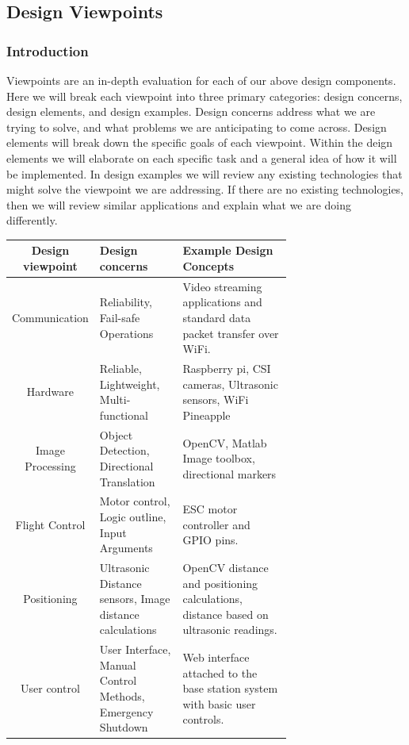 \documentclass[onecolumn, draftclsnofoot,10pt, compsoc]{IEEEtran}
\begin{document}
\subsection{Design Viewpoints} %

\subsubsection{Introduction}  
	Viewpoints are an in-depth evaluation for each of our above design components. Here we will break each viewpoint into three primary categories: design concerns, design elements, and design examples. Design concerns address what we are trying to solve, and what problems we are anticipating to come across. Design elements will break down the specific goals of each viewpoint. Within the deign elements we will elaborate on each specific task and a general idea of how it will be implemented. In design examples we will review any existing technologies that might solve the viewpoint we are addressing. If there are no existing technologies, then we will review similar applications and explain what we are doing differently. 



\begin{center}
    \begin{tabular}{|c|p{0.3\linewidth}|p{0.4\linewidth}|}
        \hline
		Design viewpoint & Design concerns & Example Design Concepts \\
        \hline
		Communication & Reliability, Fail-safe Operations  & Video streaming applications and standard data packet transfer over WiFi.  \\
		\hline 
        Hardware & Reliable, Lightweight, Multi-functional & Raspberry pi, CSI cameras, Ultrasonic sensors, WiFi Pineapple\\
		\hline 
        Image Processing & Object Detection, Directional Translation & OpenCV, Matlab Image toolbox, directional markers  \\
		\hline 
        Flight Control & Motor control, Logic outline, Input Arguments  & ESC motor controller and GPIO pins.  \\
		\hline 
        Positioning & Ultrasonic Distance sensors, Image distance calculations  & OpenCV distance and positioning calculations, distance based on ultrasonic readings.  \\
		\hline 
        User control & User Interface, Manual Control Methods, Emergency Shutdown  &  Web interface attached to the base station system with basic user controls. \\
		\hline 
    \end{tabular}
\end{center}
\end{document}
